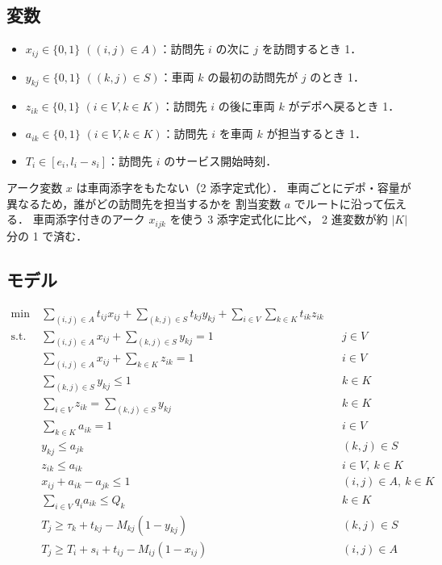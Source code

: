 \documentclass[11pt,a4paper]{ltjsarticle}
\newcommand{\Vset}{V}
\newcommand{\Kset}{K}
\begin{document}
\subsection{変数}

\begin{itemize}
  \item $x_{ij} \in \{0,1\}$ $((i,j)\in A)$：訪問先 $i$ の次に $j$ を訪問するとき 1．
  \item $y_{kj} \in \{0,1\}$ $((k,j)\in S)$：車両 $k$ の最初の訪問先が $j$ のとき 1．
  \item $z_{ik} \in \{0,1\}$ $(i\in\Vset, k\in\Kset)$：訪問先 $i$ の後に車両 $k$ がデポへ戻るとき 1．
  \item $a_{ik} \in \{0,1\}$ $(i\in\Vset, k\in\Kset)$：訪問先 $i$ を車両 $k$ が担当するとき 1．
  \item $T_i \in [e_i, l_i - s_i]$：訪問先 $i$ のサービス開始時刻．
\end{itemize}

アーク変数 $x$ は車両添字をもたない（2 添字定式化）．
車両ごとにデポ・容量が異なるため，誰がどの訪問先を担当するかを
割当変数 $a$ でルートに沿って伝える．
車両添字付きのアーク $x_{ijk}$ を使う 3 添字定式化に比べ，
2 進変数が約 $|K|$ 分の 1 で済む．

\subsection{モデル}

\begin{align}
  \min\ & \sum_{(i,j)\in A} t_{ij} x_{ij} + \sum_{(k,j)\in S} t_{kj} y_{kj}
          + \sum_{i\in\Vset}\sum_{k\in\Kset} t_{ik} z_{ik} \label{eq:obj}\\
  \text{s.t.}\
  & \sum_{(i,j)\in A} x_{ij} + \sum_{(k,j)\in S} y_{kj} = 1 && j\in\Vset \label{eq:in}\\
  & \sum_{(i,j)\in A} x_{ij} + \sum_{k\in\Kset} z_{ik} = 1 && i\in\Vset \label{eq:out}\\
  & \sum_{(k,j)\in S} y_{kj} \le 1 && k\in\Kset \label{eq:leave}\\
  & \sum_{i\in\Vset} z_{ik} = \sum_{(k,j)\in S} y_{kj} && k\in\Kset \label{eq:return}\\
  & \sum_{k\in\Kset} a_{ik} = 1 && i\in\Vset \label{eq:assign}\\
  & y_{kj} \le a_{jk} && (k,j)\in S \label{eq:startid}\\
  & z_{ik} \le a_{ik} && i\in\Vset,\ k\in\Kset \label{eq:endid}\\
  & x_{ij} + a_{ik} - a_{jk} \le 1 && (i,j)\in A,\ k\in\Kset \label{eq:arcid}\\
  & \sum_{i\in\Vset} q_i a_{ik} \le Q_k && k\in\Kset \label{eq:cap}\\
  & T_j \ge \tau_k + t_{kj} - M_{kj}(1-y_{kj}) && (k,j)\in S \label{eq:tdepot}\\
  & T_j \ge T_i + s_i + t_{ij} - M_{ij}(1-x_{ij}) && (i,j)\in A \label{eq:time}
\end{align}
\end{document}
